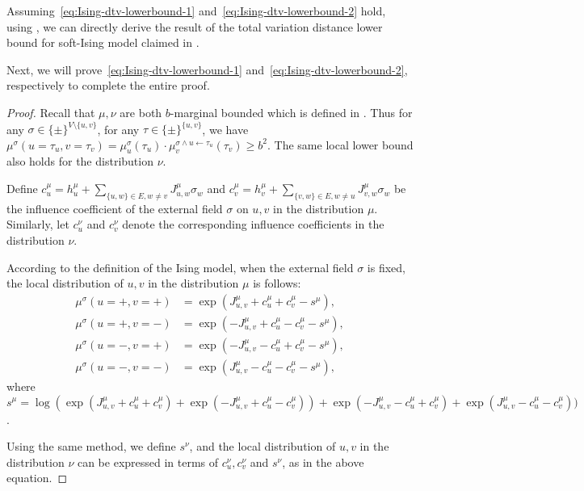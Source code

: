 Assuming~\eqref{eq:Ising-dtv-lowerbound-1} and~\eqref{eq:Ising-dtv-lowerbound-2} hold, using , 
we can directly derive the result of the total variation distance lower bound for soft-Ising model claimed in .

Next, we will prove~\eqref{eq:Ising-dtv-lowerbound-1} and~\eqref{eq:Ising-dtv-lowerbound-2},
respectively to complete the entire proof.

\begin{proof}
Recall that $\mu,\nu$ are both $b$-marginal bounded which is defined in . Thus for any $\sigma \in \{\pm\}^{V\setminus \{u,v\}}$, for any $\tau \in \{\pm\}^{\{u,v\}}$, we have $\mu^\sigma(u=\tau_u,v=\tau_v) = \mu^\sigma_u(\tau_u)\cdot \mu^{\sigma\wedge u\gets\tau_u}_v(\tau_v) \geq b^2$. The same local lower bound also holds for the distribution $\nu$.

Define $c^\mu_u=h^\mu_u+\sum_{\{u,w\}\in E, w\neq v}J^\mu_{u,w}\sigma_w$ and $c^\mu_v=h^\mu_v+\sum_{\{v,w\}\in E, w\neq u}J^\mu_{v,w}\sigma_w$ be the influence coefficient of the external field $\sigma$ on $u,v$ in the distribution $\mu$. Similarly, let $c^\nu_u$ and $c^\nu_v$ denote the corresponding influence coefficients in the distribution $\nu$. 

According to the definition of the Ising model, when the external field $\sigma$ is fixed, the local distribution of $u,v$ in the distribution $\mu$ is follows:
\begin{align*}
    \mu^\sigma(u=+,v=+) &= \exp(J^\mu_{u,v}+c^\mu_u+c^\mu_v-s^\mu),
    \\
    \mu^\sigma(u=+,v=-) &= \exp(-J^\mu_{u,v}+c^\mu_u-c^\mu_v-s^\mu),
    \\
    \mu^\sigma(u=-,v=+) &= \exp(-J^\mu_{u,v}-c^\mu_u+c^\mu_v-s^\mu),
    \\
    \mu^\sigma(u=-,v=-) &= \exp(J^\mu_{u,v}-c^\mu_u-c^\mu_v-s^\mu),
\end{align*}
where $s^\mu = \log(\exp(J^\mu_{u,v}+c^\mu_u+c^\mu_v)+\exp(-J^\mu_{u,v}+c^\mu_u-c^\mu_v))+\exp(-J^\mu_{u,v}-c^\mu_u+c^\mu_v)+\exp(J^\mu_{u,v}-c^\mu_u-c^\mu_v))$. 

Using the same method, we define $s^\nu$, and the local distribution of $u,v$ in the distribution $\nu$ can be expressed in terms of $c^\nu_u,c^\nu_v$ and $s^\nu$, as in the above equation.


\end{proof}
